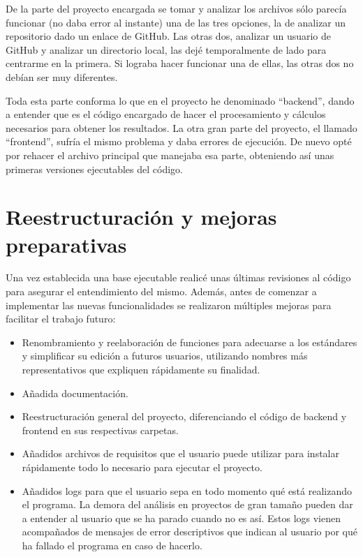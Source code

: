 \documentclass[a4paper, 12pt]{book}
\begin{document}
De la parte del proyecto encargada se tomar y analizar los archivos sólo parecía funcionar (no daba error al instante) una de las tres opciones, la de analizar un repositorio dado un enlace de GitHub. Las otras dos, analizar un usuario de GitHub y analizar un directorio local, las dejé temporalmente de lado para centrarme en la primera. Si lograba hacer funcionar una de ellas, las otras dos no debían ser muy diferentes.

Toda esta parte conforma lo que en el proyecto he denominado ``backend'', dando a entender que es el código encargado de hacer el procesamiento y cálculos necesarios para obtener los resultados. La otra gran parte del proyecto, el llamado ``frontend'', sufría el mismo problema y daba errores de ejecución. De nuevo opté por rehacer el archivo principal que manejaba esa parte, obteniendo así unas primeras versiones ejecutables del código.

\section{Reestructuración y mejoras preparativas}

Una vez establecida una base ejecutable realicé unas últimas revisiones al código para asegurar el entendimiento del mismo. Además, antes de comenzar a implementar las nuevas funcionalidades se realizaron múltiples mejoras para facilitar el trabajo futuro:

\begin{itemize}
    \item Renombramiento y reelaboración de funciones para adecuarse a los estándares y simplificar su edición a futuros usuarios, utilizando nombres más representativos que expliquen rápidamente su finalidad.
    \item Añadida documentación.
    \item Reestructuración general del proyecto, diferenciando el código de backend y frontend en sus respectivas carpetas.
    \item Añadidos archivos de requisitos que el usuario puede utilizar para instalar rápidamente todo lo necesario para ejecutar el proyecto.
    \item Añadidos logs para que el usuario sepa en todo momento qué está realizando el programa. La demora del análisis en proyectos de gran tamaño pueden dar a entender al usuario que se ha parado cuando no es así. Estos logs vienen acompañados de mensajes de error descriptivos que indican al usuario por qué ha fallado el programa en caso de hacerlo.
\end{itemize}
\end{document}
